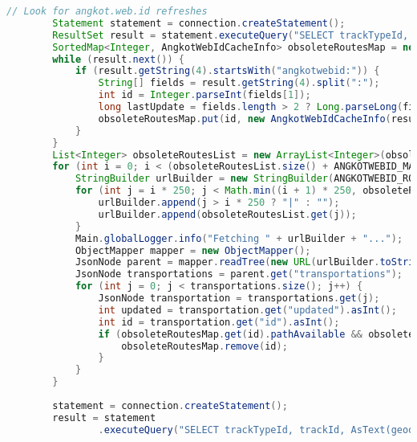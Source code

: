 \begin{lstlisting}[language=Java,basicstyle=\tiny,caption=DataPuller.java]
		// Look for angkot.web.id refreshes
		Statement statement = connection.createStatement();
		ResultSet result = statement.executeQuery("SELECT trackTypeId, trackId, AsText(geodata), internalInfo FROM tracks");
		SortedMap<Integer, AngkotWebIdCacheInfo> obsoleteRoutesMap = new TreeMap<Integer, AngkotWebIdCacheInfo>();
		while (result.next()) {
			if (result.getString(4).startsWith("angkotwebid:")) {
				String[] fields = result.getString(4).split(":");
				int id = Integer.parseInt(fields[1]);
				long lastUpdate = fields.length > 2 ? Long.parseLong(fields[2]) : 0;
				obsoleteRoutesMap.put(id, new AngkotWebIdCacheInfo(result.getString(1), result.getString(2), lastUpdate, id, result.getString(3) != null));
			}
		}
		List<Integer> obsoleteRoutesList = new ArrayList<Integer>(obsoleteRoutesMap.keySet());
		for (int i = 0; i < (obsoleteRoutesList.size() + ANGKOTWEBID_MAX_ROUTELIST - 1) / ANGKOTWEBID_MAX_ROUTELIST; i++) {
			StringBuilder urlBuilder = new StringBuilder(ANGKOTWEBID_ROUTELIST_PREFIX);
			for (int j = i * 250; j < Math.min((i + 1) * 250, obsoleteRoutesList.size()); j++) {
				urlBuilder.append(j > i * 250 ? "|" : "");
				urlBuilder.append(obsoleteRoutesList.get(j));
			}
			Main.globalLogger.info("Fetching " + urlBuilder + "...");
			ObjectMapper mapper = new ObjectMapper();
			JsonNode parent = mapper.readTree(new URL(urlBuilder.toString()));
			JsonNode transportations = parent.get("transportations");
			for (int j = 0; j < transportations.size(); j++) {
				JsonNode transportation = transportations.get(j);
				int updated = transportation.get("updated").asInt();
				int id = transportation.get("id").asInt();
				if (obsoleteRoutesMap.get(id).pathAvailable && obsoleteRoutesMap.get(id).lastUpdate >= updated) {
					obsoleteRoutesMap.remove(id);
				}
			}
		}
		
		statement = connection.createStatement();
		result = statement
				.executeQuery("SELECT trackTypeId, trackId, AsText(geodata), pathloop, penalty, transferNodes, internalInfo FROM tracks ORDER BY trackTypeId, trackId");


\end{lstlisting}

